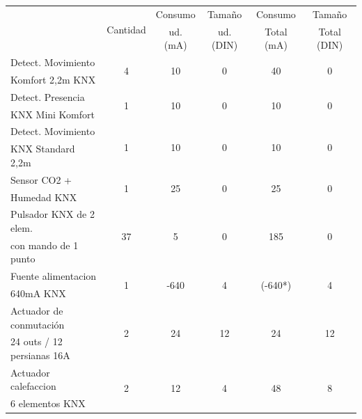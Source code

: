 \begin{flushleft}
\begin{longtable}[H]{|p{4cm}|c|c|c|c|c|}
\hline 
\rule[0mm]{0mm}{5mm}
\multirow{2}{*}{Descripción}  &  \multirow{2}{*}{Cantidad} & Consumo & Tamaño & Consumo & Tamaño\\
&  &  ud. (mA) &  ud. (DIN) &  Total  (mA) & Total (DIN)\\ \hline \hline
\endhead
\rule[0mm]{0mm}{4mm}
Detect. Movimiento &  \multirow{2}{*}{4} &  \multirow{2}{*}{10} &  \multirow{2}{*}{0} &  \multirow{2}{*}{40} &  \multirow{2}{*}{0}\\
Komfort 2,2m KNX& & & & &\\
\hline
\rule[0mm]{0mm}{4mm}
Detect. Presencia  & \multirow{2}{*}{1} & \multirow{2}{*}{10} & \multirow{2}{*}{0} & \multirow{2}{*}{10} & \multirow{2}{*}{0}\\
 KNX Mini Komfort & & & & &\\
\hline
\rule[0mm]{0mm}{4mm}
Detect. Movimiento &  \multirow{2}{*}{1} &  \multirow{2}{*}{10} &  \multirow{2}{*}{0} &  \multirow{2}{*}{10} &  \multirow{2}{*}{0}\\
 KNX Standard 2,2m & & & & &\\
\hline
\rule[0mm]{0mm}{4mm}
\rule[0mm]{0mm}{4mm}
Sensor CO2 +  & \multirow{2}{*}{1} & \multirow{2}{*}{25} & \multirow{2}{*}{0} & \multirow{2}{*}{25} & \multirow{2}{*}{0}\\
Humedad KNX & & & & &\\
\hline
\rule[0mm]{0mm}{4mm}
Pulsador KNX de 2 elem. &  \multirow{2}{*}{37} &  \multirow{2}{*}{5} &  \multirow{2}{*}{0} &  \multirow{2}{*}{185} &  \multirow{2}{*}{0}\\
con mando de 1 punto  & & & & &\\
\hline
\rule[0mm]{0mm}{4mm}
Fuente alimentacion & \multirow{2}{*}{1} & \multirow{2}{*}{-640} & \multirow{2}{*}{4} &  \multirow{2}{*}{(-640*)} & \multirow{2}{*}{4}\\
 640mA KNX  & & & & &\\
\hline
\rule[0mm]{0mm}{4mm}
Actuador de conmutación   &  \multirow{2}{*}{2} &  \multirow{2}{*}{24} &  \multirow{2}{*}{12} &  \multirow{2}{*}{24} &  \multirow{2}{*}{12}\\
24 outs / 12 persianas 16A  & & & & &\\
\hline
\rule[0mm]{0mm}{4mm}
Actuador calefaccion & \multirow{2}{*}{2} & \multirow{2}{*}{12} & \multirow{2}{*}{4} & \multirow{2}{*}{48} & \multirow{2}{*}{8}\\
6 elementos KNX & & & & &\\

\end{longtable}
\end{flushleft}
